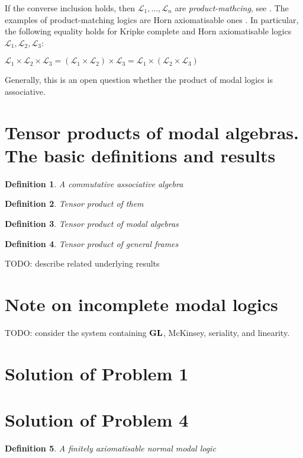\documentclass[a4paper]{article}
\theoremstyle{defin}
\newtheorem{defin}{Definition}
\theoremstyle{theorem}
\theoremstyle{prop}
\theoremstyle{lemma}
\theoremstyle{ex}
\theoremstyle{col}
\begin{document}
If the converse inclusion holds, then $\mathcal{L}_1, \dots, \mathcal{L}_n$ are \emph{product-mathcing}, see \cite{gabbay1998products}. The examples of product-matching logics are Horn axiomatisable ones \cite{kurucz2003many}. In particular, the following equality holds for Kripke complete and Horn axiomatisable logics $\mathcal{L}_1, \mathcal{L}_2, \mathcal{L}_3$:

\begin{center}
  $\mathcal{L}_1 \times \mathcal{L}_2 \times \mathcal{L}_3 = (\mathcal{L}_1 \times \mathcal{L}_2) \times \mathcal{L}_3 = \mathcal{L}_1 \times (\mathcal{L}_2 \times \mathcal{L}_3)$
\end{center}

Generally, this is an open question whether the product of modal logics is associative.

\section{Tensor products of modal algebras. The basic definitions and results}

\begin{defin} A commutative associative algebra
\end{defin}

\begin{defin} Tensor product of them
\end{defin}

\begin{defin} Tensor product of modal algebras
\end{defin}

\begin{defin} Tensor product of general frames
\end{defin}

TODO: describe related underlying results

\section{Note on incomplete modal logics}

TODO: consider the system containing ${\bf GL}$, McKinsey, seriality, and linearity.

\section{Solution of Problem 1}

\section{Solution of Problem 4}

\begin{defin} A finitely axiomatisable normal modal logic
\end{defin}



\end{document}
